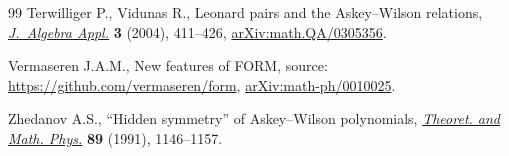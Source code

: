 \begin{thebibliography}{99}
Terwilliger P., Vidunas R., Leonard pairs and the {A}skey--{W}ilson relations,
 \href{https://doi.org/10.1142/S0219498804000940}{\textit{J.~Algebra Appl.}} \textbf{3} (2004), 411--426,
 \href{https://arxiv.org/abs/math.QA/0305356}{arXiv:math.QA/0305356}.

Vermaseren J.A.M., New features of {FORM}, source:
 \url{https://github.com/vermaseren/form}, \href{https://arxiv.org/abs/math-ph/0010025}{arXiv:math-ph/0010025}.

Zhedanov A.S., ``{H}idden symmetry'' of {A}skey--{W}ilson polynomials,
 \href{https://doi.org/10.1007/BF01015906}{\textit{Theoret. and Math. Phys.}} \textbf{89} (1991), 1146--1157.

\end{thebibliography}
